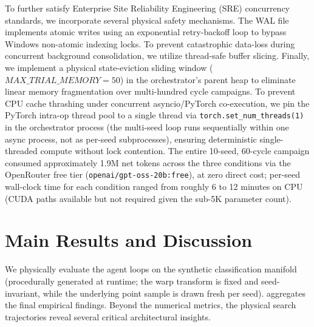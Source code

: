 \documentclass[conference]{IEEEtran}
\begin{document}
To further satisfy Enterprise Site Reliability Engineering (SRE) concurrency standards, we incorporate several physical safety mechanisms. The WAL file implements atomic writes using an exponential retry-backoff loop to bypass Windows non-atomic indexing locks. To prevent catastrophic data-loss during concurrent background consolidation, we utilize thread-safe buffer slicing. Finally, we implement a physical state-eviction sliding window ($MAX\_TRIAL\_MEMORY = 50$) in the orchestrator's parent heap to eliminate linear memory fragmentation over multi-hundred cycle campaigns. To prevent CPU cache thrashing under concurrent asyncio/PyTorch co-execution, we pin the PyTorch intra-op thread pool to a single thread via \texttt{torch.set\_num\_threads(1)} in the orchestrator process (the multi-seed loop runs sequentially within one async process, not as per-seed subprocesses), ensuring deterministic single-threaded compute without lock contention. The entire 10-seed, 60-cycle campaign consumed approximately 1.9M net tokens across the three conditions via the OpenRouter free tier (\texttt{openai/gpt-oss-20b:free}), at zero direct cost; per-seed wall-clock time for each condition ranged from roughly 6 to 12 minutes on CPU (CUDA paths available but not required given the sub-5K parameter count).

\section{Main Results and Discussion}
\label{sec:results}

We physically evaluate the agent loops on the synthetic classification manifold (procedurally generated at runtime; the warp transform is fixed and seed-invariant, while the underlying point sample is drawn fresh per seed).  aggregates the final empirical findings. Beyond the numerical metrics, the physical search trajectories reveal several critical architectural insights.
\end{document}
